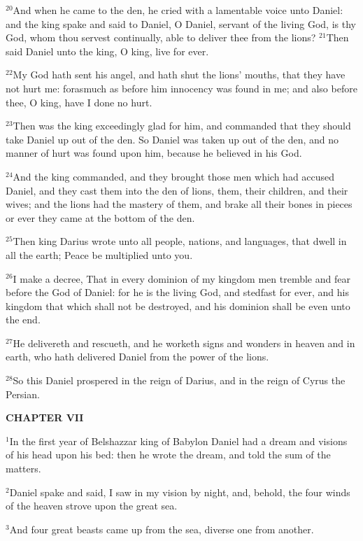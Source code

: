 \documentclass[12pt]{article}
\begin{document}
$^{20}$And when he came to the den, he cried with a lamentable voice
unto Daniel: and the king spake and said to Daniel, O Daniel, servant
of the living God, is thy God, whom thou servest continually, able to
deliver thee from the lions?  $^{21}$Then said Daniel unto the king, O
king, live for ever.


$^{22}$My God hath sent his angel, and hath shut the lions' mouths, that
they have not hurt me: forasmuch as before him innocency was found in
me; and also before thee, O king, have I done no hurt.


$^{23}$Then was the king exceedingly glad for him, and commanded that
they should take Daniel up out of the den. So Daniel was taken up out
of the den, and no manner of hurt was found upon him, because he
believed in his God.


$^{24}$And the king commanded, and they brought those men which had
accused Daniel, and they cast them into the den of lions, them, their
children, and their wives; and the lions had the mastery of them, and
brake all their bones in pieces or ever they came at the bottom of the
den.


$^{25}$Then king Darius wrote unto all people, nations, and languages,
that dwell in all the earth; Peace be multiplied unto you.


$^{26}$I make a decree, That in every dominion of my kingdom men tremble
and fear before the God of Daniel: for he is the living God, and
stedfast for ever, and his kingdom that which shall not be destroyed,
and his dominion shall be even unto the end.


$^{27}$He delivereth and rescueth, and he worketh signs and wonders in
heaven and in earth, who hath delivered Daniel from the power of the
lions.


$^{28}$So this Daniel prospered in the reign of Darius, and in the reign
of Cyrus the Persian.





\begin{center}
\textbf{\small CHAPTER VII}
\end{center}
$^{1}$In the first year of Belshazzar king of Babylon Daniel had a dream
and visions of his head upon his bed: then he wrote the dream, and
told the sum of the matters.


$^{2}$Daniel spake and said, I saw in my vision by night, and, behold,
the four winds of the heaven strove upon the great sea.


$^{3}$And four great beasts came up from the sea, diverse one from
another.
\end{document}
